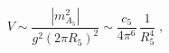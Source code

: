 \begin{equation}
V \sim \frac{|m_{A_5}^2|}{g^2 (2\pi R_5)^2} \sim \frac{c_5}{4\pi^6}\,
\frac{1}{R_5^4} \;,
\end{equation}

